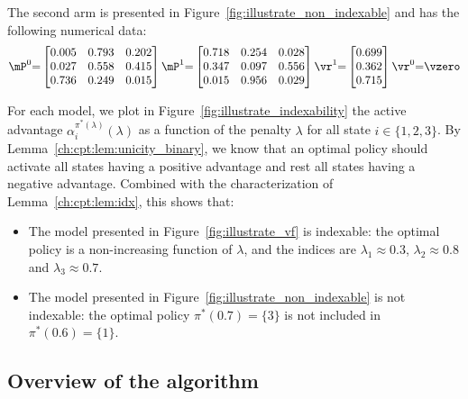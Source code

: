 The second arm is presented in Figure~\ref{fig:illustrate_non_indexable} and has the following numerical data:
\begin{equation*}
    \mP^0{=}\begin{bmatrix}
        0.005 & 0.793 & 0.202 \\
        0.027 & 0.558 & 0.415 \\
        0.736 & 0.249 & 0.015
    \end{bmatrix}
    \mP^1{=}\begin{bmatrix}
        0.718 & 0.254 & 0.028 \\
        0.347 & 0.097 & 0.556 \\
        0.015 & 0.956 & 0.029
    \end{bmatrix}
    \vr^1{=}\begin{bmatrix}
        0.699 \\
        0.362 \\
        0.715
    \end{bmatrix} \vr^0{=}\vzero
\end{equation*}

For each model, we plot in Figure~\ref{fig:illustrate_indexability} the active advantage $\alpha^{\pi^*(\lambda)}_i(\lambda)$ as a function of the penalty $\lambda$ for all state $i\in\{1,2,3\}$.
By Lemma~\ref{ch:cpt:lem:unicity_binary}, we know that an optimal policy should activate all states having a positive advantage and rest all states having a negative advantage.
Combined with the characterization of Lemma~\ref{ch:cpt:lem:idx}, this shows that:
\begin{itemize}
    \item The model presented in Figure~\ref{fig:illustrate_vf} is indexable: the optimal policy is a non-increasing function of $\lambda$, and the indices are $\lambda_1\approx0.3$, $\lambda_2\approx0.8$ and $\lambda_3\approx0.7$.
    \item The model presented in Figure~\ref{fig:illustrate_non_indexable} is not indexable: the optimal policy $\pi^*(0.7)=\{3\}$ is not included in $\pi^*(0.6)=\{1\}$. 
\end{itemize}

\subsection{Overview of the algorithm}
\label{ssec:informal_widx_algo}

